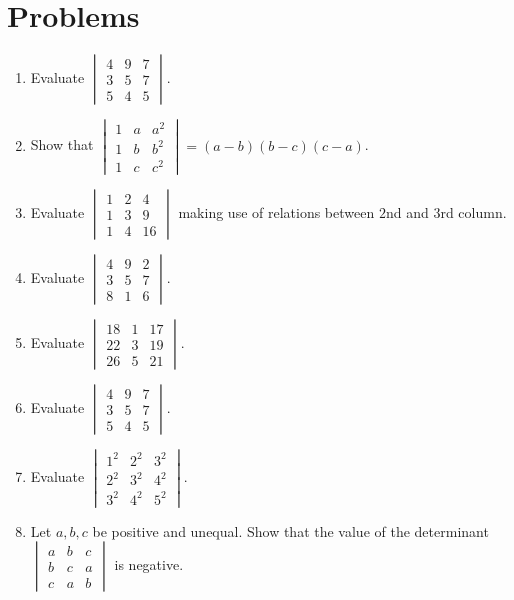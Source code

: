 \section{Problems}
\begin{enumerate}
\item Evaluate $\begin{vmatrix}4 & 9 & 7\\3 & 5 & 7\\5 & 4 & 5\end{vmatrix}$.
\item Show that $\begin{vmatrix}1 & a& a^2\\1 & b & b^2\\1 & c & c^2\end{vmatrix} = (a - b)(b - c)(c - a)$.
\item Evaluate $\begin{vmatrix}1 & 2& 4\\1 & 3 & 9\\1 & 4 & 16\end{vmatrix}$ making use of relations between $2$nd and $3$rd
  column.
\item Evaluate $\begin{vmatrix}4 & 9 & 2\\3 & 5 & 7\\8 & 1 & 6\end{vmatrix}$.
\item Evaluate $\begin{vmatrix}18 & 1 & 17\\22 & 3 & 19\\26 & 5 & 21\end{vmatrix}$.
\item Evaluate $\begin{vmatrix}4 & 9 & 7\\3 & 5 & 7\\5 & 4 & 5\end{vmatrix}$.
\item Evaluate $\begin{vmatrix}1^2 & 2^2 & 3^2\\2^2 & 3^2 & 4^2\\3^2 & 4^2 & 5^2\end{vmatrix}$.
\item Let $a, b, c$ be positive and unequal. Show that the value of the determinant $\begin{vmatrix}a & b & c\\b & c & a\\c & a &
  b\end{vmatrix}$ is negative.

\end{enumerate}

